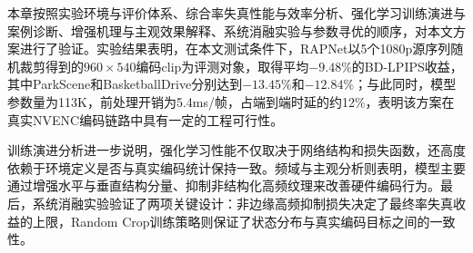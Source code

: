 本章按照实验环境与评价体系、综合率失真性能与效率分析、强化学习训练演进与案例诊断、增强机理与主观效果解释、系统消融实验与参数寻优的顺序，对本文方案进行了验证。实验结果表明，在本文测试条件下，RAPNet以5个1080p源序列随机裁剪得到的$960\times540$编码clip为评测对象，取得平均$-9.48\%$的BD-LPIPS收益，其中ParkScene和BasketballDrive分别达到$-13.45\%$和$-12.84\%$；与此同时，模型参数量为113K，前处理开销为5.4ms/帧，占端到端时延的约12\%，表明该方案在真实NVENC编码链路中具有一定的工程可行性。

训练演进分析进一步说明，强化学习性能不仅取决于网络结构和损失函数，还高度依赖于环境定义是否与真实编码统计保持一致。频域与主观分析则表明，模型主要通过增强水平与垂直结构分量、抑制非结构化高频纹理来改善硬件编码行为。最后，系统消融实验验证了两项关键设计：非边缘高频抑制损失决定了最终率失真收益的上限，Random Crop训练策略则保证了状态分布与真实编码目标之间的一致性。
